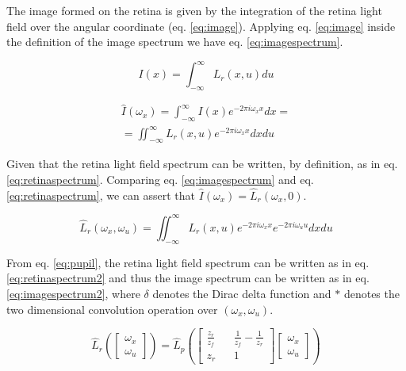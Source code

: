 \documentclass[acmtog,review,anonymous]{acmart}
\begin{document}
The image formed on the retina is given by the integration of the retina light field over the angular coordinate (eq. \ref{eq:image}). Applying eq. \ref{eq:image} inside the definition of the image spectrum we have eq. \ref{eq:imagespectrum}.

\begin{equation} \label{eq:image}
I(x) = \int_{-\infty}^{\infty} L_{r}\left(x, u\right) du
\end{equation}

\begin{equation} \label{eq:imagespectrum}
\begin{split}
\hat{I}(\omega_{x}) = \int_{-\infty}^{\infty} I(x) e^{-2 \pi i \omega_{x} x} dx =\\
=\iint_{-\infty}^{\infty} L_{r}\left(x, u\right) e^{-2 \pi i \omega_{x} x} dx du
\end{split}
\end{equation}

Given that the retina light field spectrum can be written, by definition, as in eq. \ref{eq:retinaspectrum}. Comparing eq. \ref{eq:imagespectrum} and eq. \ref{eq:retinaspectrum}, we can assert that $\hat{I}(\omega_{x}) = \hat{L}_{r}(\omega_{x}, 0)$.

\begin{equation} \label{eq:retinaspectrum}
\hat{L}_{r}(\omega_{x}, \omega_{u}) =
\iint_{-\infty}^{\infty} L_{r}\left(x, u\right) e^{-2 \pi i \omega_{x} x} e^{-2 \pi i \omega_{u} u} dx du
\end{equation}

From eq. \ref{eq:pupil}, the retina light field spectrum can be written as in eq. \ref{eq:retinaspectrum2} and thus the image spectrum can be written as in eq. \ref{eq:imagespectrum2}, where $\delta$ denotes the Dirac delta function and $\ast$ denotes the two dimensional convolution operation over $(\omega_{x}, \omega_{u})$.

\begin{equation} \label{eq:retinaspectrum2}
\hat{L}_{r}\left(\begin{bmatrix}\omega_{x}\\\omega_{u}\end{bmatrix}\right) =
\hat{L}_{p}\left(\begin{bmatrix}\frac{z_{r}}{z_{f}} && \frac{1}{z_{f}} - \frac{1}{z_{r}}\\z_{r} && 1\end{bmatrix} \begin{bmatrix}\omega_{x}\\\omega_{u}\end{bmatrix}\right)
\end{equation}
\end{document}
